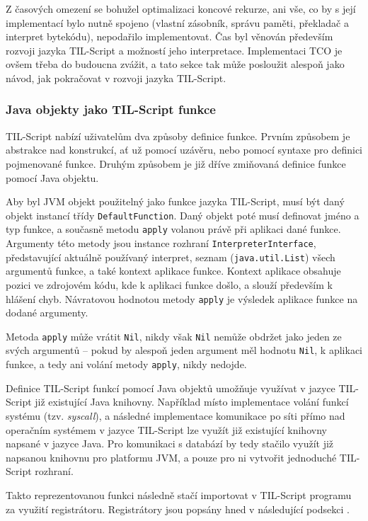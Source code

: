 Z časových omezení se bohužel optimalizaci koncové rekurze, ani vše, co by s její implementací bylo
nutně spojeno (vlastní zásobník, správu paměti, překladač a interpret bytekódu), nepodařilo
implementovat. Čas byl věnován především rozvoji jazyka TIL-Script a možností jeho interpretace.
Implementaci TCO je ovšem třeba do budoucna zvážit, a tato sekce tak může posloužit alespoň jako
návod, jak pokračovat v rozvoji jazyka TIL-Script.

\subsubsection{Java objekty jako TIL-Script funkce}

TIL-Script nabízí uživatelům dva způsoby definice funkce. Prvním způsobem je abstrakce
nad konstrukcí, ať už pomocí uzávěru, nebo pomocí syntaxe pro definici pojmenované funkce. Druhým
způsobem je již dříve zmiňovaná definice funkce pomocí Java objektu.

Aby byl JVM objekt použitelný jako funkce jazyka TIL-Script, musí být daný objekt instancí třídy
\lstinline{DefaultFunction}. Daný objekt poté musí definovat jméno a typ funkce, a současně metodu
\lstinline{apply} volanou právě při aplikaci dané funkce. Argumenty této metody jsou instance
rozhraní \lstinline{InterpreterInterface}, představující aktuálně používaný interpret, seznam
(\lstinline{java.util.List}) všech argumentů funkce, a také kontext aplikace funkce. Kontext
aplikace obsahuje pozici ve zdrojovém kódu, kde k aplikaci funkce došlo, a slouží především
k hlášení chyb. Návratovou hodnotou metody \lstinline{apply} je výsledek aplikace funkce na dodané
argumenty.

Metoda \lstinline{apply} může vrátit \lstinline{Nil}, nikdy však \lstinline{Nil} nemůže obdržet
jako jeden ze svých argumentů -- pokud by alespoň jeden argument měl hodnotu \lstinline{Nil},
k aplikaci funkce, a tedy ani volání metody \lstinline{apply}, nikdy nedojde.

Definice TIL-Script funkcí pomocí Java objektů umožňuje využívat v jazyce TIL-Script již existující
Java knihovny. Například místo implementace volání funkcí systému (tzv. \textit{syscall}),
a následné implementace komunikace po síti přímo nad operačním systémem v jazyce TIL-Script lze
využít již existující knihovny napsané v jazyce Java. Pro komunikaci s databází by tedy stačilo
využít již napsanou knihovnu pro platformu JVM, a pouze pro ni vytvořit jednoduché TIL-Script
rozhraní.

Takto reprezentovanou funkci následně stačí importovat v TIL-Script programu za využití
registrátoru. Registrátory jsou popsány hned v následující podsekci .

